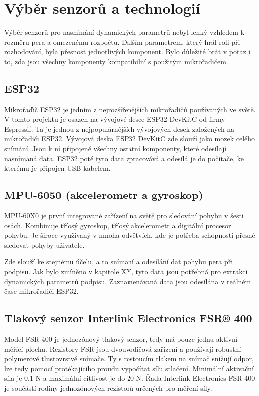 \section{Výběr senzorů a technologií}
Výběr senzorů pro nasnímání dynamických parametrů nebyl lehký vzhledem k rozměru pera a omezenému rozpočtu. %
Dalším parametrem, který hrál roli při rozhodování, byla přesnost jednotlivých komponent.                   %
Bylo důležité brát v potaz i to, zda jsou všechny komponenty kompatibilní s použitým mikrořadičem.          %

\subsection*{ESP32}
Mikrořaďič ESP32 je jedním z nejrozšířenějších mikrořadičů používaných ve světě.                            %
V tomto projektu je osazen na vývojové desce ESP32 DevKitC od firmy Espressif.                              %
Ta je jednou z nejpopulárnějších vývojových desek založených na mikrořadiči ESP32.                          %
Vývojová deska ESP32 DevKitC zde slouží jako mozek celého snímání.                                          %
Jsou k ní připojené všechny ostatní komponenty, které odesílají nasnímaná data.                             %
ESP32 poté tyto data zpracovává a odesílá je do počítače, ke kterému je připojen USB kabelem.               %

\subsection*{MPU-6050 (akcelerometr a gyroskop)}
MPU-60X0 je první integrované zařízení na světě pro sledování pohybu v šesti osách.                 %
Kombinuje tříosý gyroskop, tříosý akcelerometr a digitální procesor pohybu.                         %
Je široce využívaný v mnoha odvětvích, kde je potřeba schopnosti přesně sledovat pohyby uživatele.  %

Zde slouží ke stejnému účelu, a to snímaní a odesílání dat pohybu pera při podpisu.                 %
Jak bylo zmíněno v kapitole XY, tyto data jsou potřebná pro extrakci dynamických parametrů podpisu. %
Zaznamenávaná data jsou odesílána v reálném čase mikrořadiči ESP32.                                 %

\subsection*{Tlakový senzor Interlink Electronics FSR® 400}
Model FSR 400 je jednozónový tlakový senzor, tedy má pouze jednu aktivní měřící plochu.                       %
Rezistory FSR jsou dvouvodičová zařízení a používají robustní polymerové tlustovrstvé snímače.                %
Ty s rostoucím tlakem na snímač snižují odpor, lze tedy pomocí protékajícího proudu vypočítat sílu stlačení.  %
Minimální aktivační síla je 0,1 N a maximální citlivost je do 20 N.                                           %
Řada Interlink Electronics FSR 400 je součástí rodiny jednozónových rezistorů určených pro měření síly.       %


